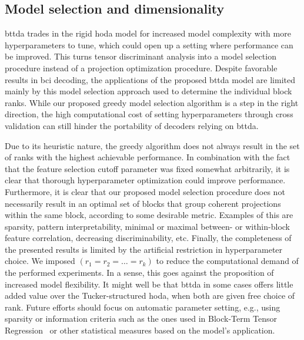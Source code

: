 \documentclass[10pt]{iopart}
\begin{document}
\subsection{Model selection and dimensionality}

\Ac{bttda} trades in the rigid \ac{hoda} model for increased model complexity with more
hyperparameters to tune, which could open up a setting where performance can be
improved.
This turns tensor discriminant analysis into a model selection procedure
instead of a projection optimization procedure.
Despite favorable results in \ac{bci} decoding, the applications of the proposed
\ac{bttda} model are limited mainly by this model selection approach used
to determine the individual block ranks.
While our proposed greedy model selection algorithm is a step in the right
direction, the high computational cost of setting hyperparameters through cross
validation can still hinder the portability of decoders relying on
\ac{bttda}.

Due to its heuristic nature, the greedy algorithm does not always result in the
set of ranks with the highest achievable performance.
In combination with the fact that the feature selection cutoff parameter was
fixed somewhat arbitrarily, it is clear that thorough
hyperparameter optimization could improve performance.
Furthermore, it is clear that our proposed model selection procedure does not
necessarily result in an optimal set of blocks that group coherent projections
within the same block, according to some desirable metric.
Examples of this are sparsity, pattern interpretability, minimal or maximal
between- or within-block feature correlation, decreasing discriminability, etc.
Finally, the completeness of the presented results is limited by the artificial
restriction in hyperparameter choice.
We imposed $(r_1=r_2=\ldots=r_k)$ to reduce the computational demand of
the performed experiments.
In a sense, this goes against the proposition of increased model flexibility.
It might well be that \ac{bttda} in some cases offers little added value over the
Tucker-structured \ac{hoda}, when both are given free choice of rank.
Future efforts should focus on automatic parameter setting, e.g., using sparsity
or information criteria such as the ones used in Block-Term Tensor Regression~\cite{Faes2022}
or other statistical measures based on the model's application.
\end{document}
